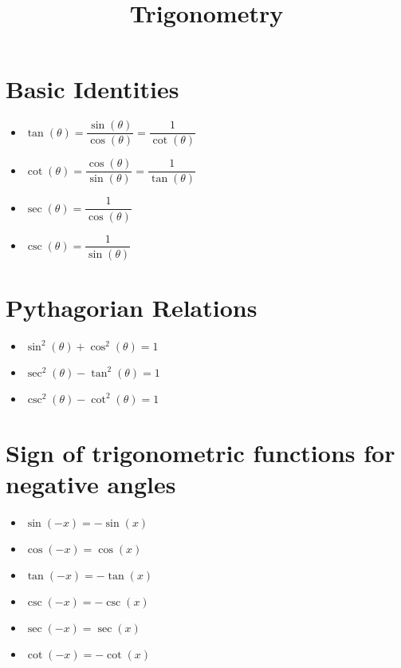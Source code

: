 \documentclass{article}
\title{Trigonometry}
\begin{document}
\maketitle
\section{Basic Identities}
\begin{itemize}
\item $\tan(\theta)=\dfrac{\sin(\theta)}{\cos(\theta)}=\dfrac{1}{\cot(\theta)}$
\item $\cot(\theta)=\dfrac{\cos(\theta)}{\sin(\theta)}=\dfrac{1}{\tan(\theta)}$
\item $\sec(\theta)=\dfrac{1}{\cos(\theta)}$
\item $\csc(\theta)=\dfrac{1}{\sin(\theta)}$
\end{itemize}

\maketitle
\section{Pythagorian Relations}
\begin{itemize}
\item $\sin^2(\theta)+\cos^2(\theta) = 1$
\item $\sec^2(\theta)-\tan^2(\theta) = 1$
\item $\csc^2(\theta)-\cot^2(\theta) = 1$
\end{itemize}

\maketitle
\section{Sign of trigonometric functions for negative angles}

\begin{itemize}
\item $\sin(-x) = -\sin(x)$
\item $\cos(-x) = \cos(x)$
\item $\tan(-x) = -\tan(x)$
\item $\csc(-x) = -\csc(x)$
\item $\sec(-x) = \sec(x)$
\item $\cot(-x) = -\cot(x)$
\end{itemize}
\end{document}
